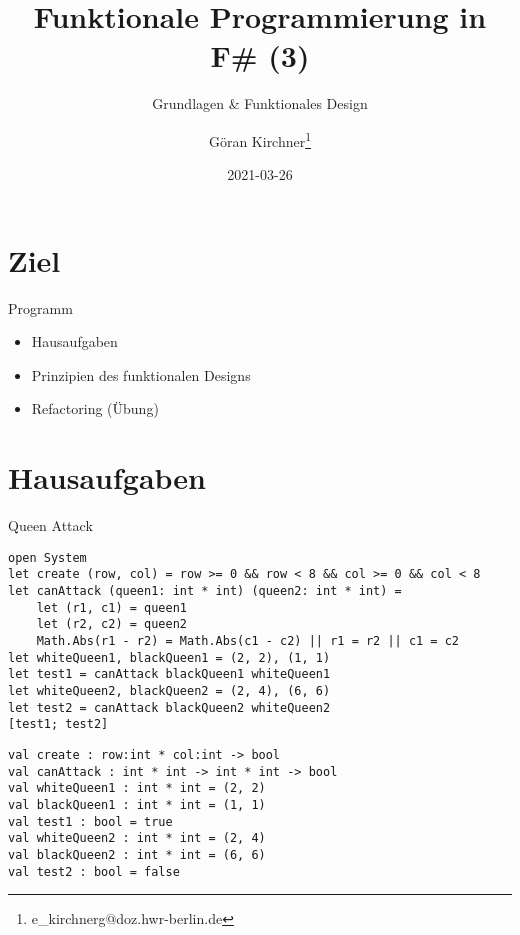 \documentclass[t]{beamer}
\author{Göran Kirchner\thanks{e\_kirchnerg@doz.hwr-berlin.de}}
\date{2021-03-26}
\title{Funktionale Programmierung in F\# (3)}
\subtitle{Grundlagen \& Funktionales Design}
\begin{document}
\maketitle

\section{Ziel }
\label{sec:org83e3ac2}

\begin{frame}[label={sec:org5463128}]{Programm}
\begin{itemize}
\item Hausaufgaben
\item Prinzipien des funktionalen Designs
\item Refactoring (Übung)
\end{itemize}
\end{frame}

\section{Hausaufgaben }
\label{sec:org03c38bb}
\begin{frame}[label={sec:orgf94adee},fragile]{Queen Attack}
 \begin{verbatim}
open System
let create (row, col) = row >= 0 && row < 8 && col >= 0 && col < 8
let canAttack (queen1: int * int) (queen2: int * int) = 
    let (r1, c1) = queen1
    let (r2, c2) = queen2
    Math.Abs(r1 - r2) = Math.Abs(c1 - c2) || r1 = r2 || c1 = c2
let whiteQueen1, blackQueen1 = (2, 2), (1, 1)
let test1 = canAttack blackQueen1 whiteQueen1
let whiteQueen2, blackQueen2 = (2, 4), (6, 6)
let test2 = canAttack blackQueen2 whiteQueen2
[test1; test2]
\end{verbatim}

\begin{verbatim}
val create : row:int * col:int -> bool
val canAttack : int * int -> int * int -> bool
val whiteQueen1 : int * int = (2, 2)
val blackQueen1 : int * int = (1, 1)
val test1 : bool = true
val whiteQueen2 : int * int = (2, 4)
val blackQueen2 : int * int = (6, 6)
val test2 : bool = false
\end{verbatim}
\end{frame}
\end{document}
